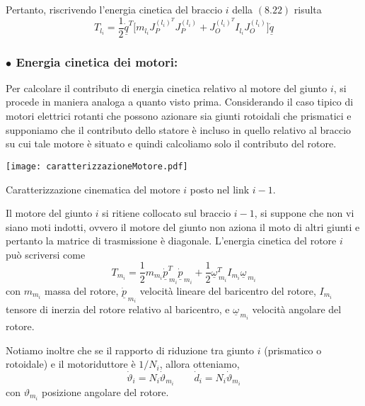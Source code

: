 Pertanto, riscrivendo l'energia cinetica del braccio $i$ della $(8.22)$ risulta
\begin{equation}
	T_{l_i} = \frac{1}{2} \underline{\dot{q}}^T \Biggl[ m_{l_i} J_P^{(l_i)^T} J_P^{(l_i)} + J_O^{(l_i)^T} I_{l_i} J_O^{(l_i)} \Biggr]\underline{\dot{q}}
\end{equation}

\subsubsection{$\bullet$ Energia cinetica dei motori:}
Per calcolare il contributo di energia cinetica relativo al motore del giunto $i$, si procede in maniera analoga a quanto visto prima. Considerando il caso tipico di motori elettrici rotanti che possono azionare sia giunti rotoidali che prismatici e supponiamo che il contributo dello statore è incluso in quello relativo al braccio su cui tale motore è situato e quindi calcoliamo solo il contributo del rotore.

\begin{center}
	\texttt{[image: caratterizzazioneMotore.pdf]}
	\caption{Caratterizzazione cinematica del motore $i$ posto nel link $i-1$.}
\end{center}

Il motore del giunto $i$ si ritiene collocato sul braccio $i-1$, si suppone che non vi siano moti indotti, ovvero il motore del giunto non aziona il moto di altri giunti e pertanto la matrice di trasmissione è diagonale. L'energia cinetica del rotore $i$ può scriversi come
\begin{equation}
	T_{m_i} = \frac{1}{2} m_{m_i} \dot{\underline{p}}_{\,m_i}^T \dot{\underline{p}}_{\,m_i} + \frac{1}{2} \underline{\omega}_{\,m_i}^T I_{m_i} \underline{\omega}_{\,m_i}
\end{equation}
con $m_{m_i}$ massa del rotore, $\underline{\dot{p}}_{\,m_i}$ velocità lineare del baricentro del rotore, $I_{m_i}$ tensore di inerzia del rotore relativo al baricentro, e $\underline{\omega}_{\,m_i}$ velocità angolare del rotore. 

Notiamo inoltre che se il rapporto di riduzione tra giunto $i$ (prismatico o rotoidale) e il motoriduttore è $1/N_i$, allora otteniamo,
\begin{equation}
	\dot{\vartheta}_i = N_i \dot{\vartheta}_{m_i} \qquad \dot{d}_i = N_i \dot{\vartheta}_{m_i}
\end{equation} 
con $\vartheta_{m_i}$ posizione angolare del rotore.

